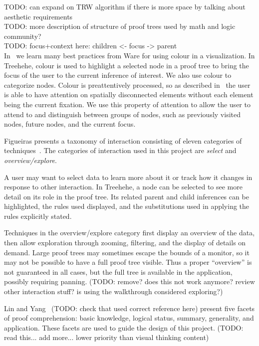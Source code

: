 \documentclass[conference]{IEEEtran}
\newcommand{\projectname}{Treehehe}
\begin{document}
TODO: can expand on TRW algorithm if there is more space by talking about aesthetic requirements \\

TODO: more description of structure of proof trees used by math and logic community? \\

TODO: focus+context here: children <- focus -> parent \\

In~\cite[Chapter 3]{infovis-ware} we learn many best practices from Ware for using colour in a visualization. In \projectname{}, colour is used to highlight a selected node in a proof tree to bring the focus of the user to the current inference of interest. We also use colour to categorize nodes. Colour is preattentively processed, so as described in~\cite[Chapter 11]{infovis-ware} the user is able to have attention on spatially disconnected elements without each element being the current fixation. We use this property of attention to allow the user to attend to and distinguish between groups of nodes, such as previously visited nodes, future nodes, and the current focus.

Figueiras presents a taxonomy of interaction consisting of eleven categories of techniques~\cite{interaction-figueiras}. The categories of interaction used in this project are \textit{select} and \textit{overview/explore}.

A user may want to select data to learn more about it or track how it changes in response to other interaction. In \projectname{}, a node can be selected to see more detail on its role in the proof tree. Its related parent and child inferences can be highlighted, the rules used displayed, and the substitutions used in applying the rules explicitly stated.

Techniques in the overview/explore category first display an overview of the data, then allow exploration through zooming, filtering, and the display of details on demand. Large proof trees may sometimes escape the bounds of a monitor, so it may not be possible to have a full proof tree visible. Thus a proper ``overview'' is not guaranteed in all cases, but the full tree is available in the application, possibly requiring panning. (TODO: remove? does this not work anymore? review other interaction stuff? is using the walkthrough considered exploring?)

Lin and Yang~\cite{readingcompgeometric-lin+yang} (TODO: check that used correct reference here) present five facets of proof comprehension: basic knowledge, logical status, summary, generality, and application. These facets are used to guide the design of this project. (TODO: read this... add more... lower priority than visual thinking content)
\end{document}
